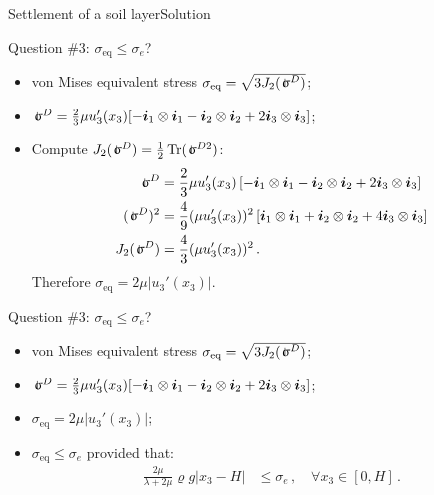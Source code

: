 \documentclass{beamer}
\newcommand{\trace}{\operatorname{Tr}}
\newcommand{\demi}{\frac{1}{2}}
\newcommand{\uj}{u}
\newcommand{\xj}{x}
\renewcommand{\ij}{i}
\newcommand{\iv}{{\boldsymbol\ij}}
\newcommand{\roi}{\varrho}
\newcommand*{\stressj}{\sigma}
\newcommand{\stress}{\mbox{$\hspace{0.3em}\rotatebox[x=0pt,y=0.2pt]{90}{\rule{0.017\linewidth}{0.4pt}}\hspace{-0.25em}\upsigma$}}
\newcommand{\abs}[1]{\left|#1\right|}
\begin{document}
\begin{frame}{Settlement of a soil layer}{Solution}
\begin{overprint}
\vskip-20pt
\begin{exampleblock}{Question \#3: $\stressj_\text{eq}\leq\stressj_e$?}
\begin{itemize}
\item von Mises equivalent stress $\stressj_\text{eq}=\sqrt{3J_2(\stress^D)}$;
\item $\smash{\stress^D}=\smash{\frac{2}{3}\mu\uj_3'(\xj_3)[-\iv_1\otimes\iv_1-\iv_2\otimes\iv_2+2\iv_3\otimes\iv_3]}$;
\item Compute $J_2(\stress^D)=\demi\trace(\stress^{D2})$:
\begin{displaymath}
\begin{split}
\stress^D &=\frac{2}{3}\mu\uj_3'(\xj_3)\left[-\iv_1\otimes\iv_1-\iv_2\otimes\iv_2+2\iv_3\otimes\iv_3\right] \\
(\stress^D)^2 &= \frac{4}{9}(\mu\uj_3'(\xj_3))^2\left[\iv_1\otimes\iv_1+\iv_2\otimes\iv_2+4\iv_3\otimes\iv_3\right] \\
J_2(\stress^D) &=  \frac{4}{3}(\mu\uj_3'(\xj_3))^2\,.
\end{split}
\end{displaymath}
Therefore $\stressj_\text{eq} = 2\mu\abs{\uj_3'(\xj_3)}$.
\end{itemize}
\end{exampleblock}

\vskip-20pt
\begin{exampleblock}{Question \#3: $\stressj_\text{eq}\leq\stressj_e$?}
\begin{itemize}
\item von Mises equivalent stress $\stressj_\text{eq}=\sqrt{3J_2(\stress^D)}$;
\item $\smash{\stress^D}=\smash{\frac{2}{3}\mu\uj_3'(\xj_3)[-\iv_1\otimes\iv_1-\iv_2\otimes\iv_2+2\iv_3\otimes\iv_3]}$;
\item $\stressj_\text{eq} = 2\mu\abs{\uj_3'(\xj_3)}$;
\item $\stressj_\text{eq} \leq \stressj_e$ provided that:
\begin{displaymath}
\begin{split}
\frac{2\mu}{\lambda+2\mu}\roi g \abs{\xj_3-H} &\leq \stressj_e\,,\quad\forall\xj_3\in[0,H]\,.
\end{split}
\end{displaymath}
\end{itemize}
\end{exampleblock}


\end{overprint}
\end{frame}
\end{document}
